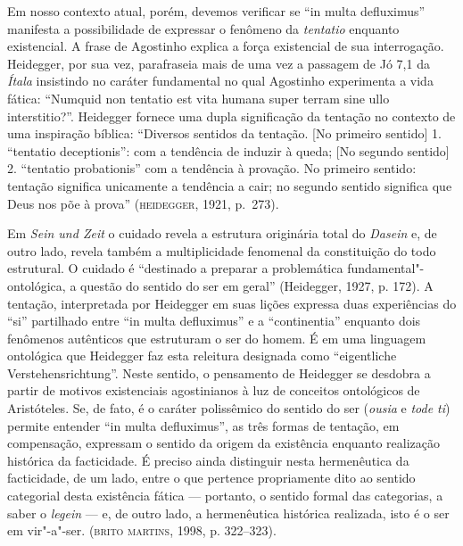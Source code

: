Em nosso contexto atual, porém, devemos verificar se “in multa
defluximus” manifesta a possibilidade de expressar o fenômeno da
\emph{tentatio} enquanto existencial. A frase de Agostinho
explica a força existencial de sua interrogação. Heidegger, por
sua vez, parafraseia mais de uma vez a passagem de Jó 7,1 da
\emph{Ítala} insistindo no caráter fundamental no qual
Agostinho experimenta a vida fática: “Numquid non tentatio est
vita humana super terram sine ullo interstitio?”. Heidegger
fornece uma dupla significação da tentação no contexto de uma
inspiração bíblica: “Diversos sentidos da tentação. [No primeiro
sentido] 1. ``tentatio deceptionis'': com a tendência de induzir à
queda; [No segundo sentido] 2. ``tentatio probationis'' com a
tendência à provação. No primeiro sentido: tentação significa
unicamente a tendência a cair; no segundo sentido significa que
Deus nos põe à prova”  (\textsc{heidegger}, 1921, p.~273).

Em \emph{Sein und Zeit} o cuidado revela a estrutura originária
total do \emph{Dasein} e, de outro lado, revela também a
multiplicidade fenomenal da constituição do todo estrutural. O
cuidado é “destinado a preparar a problemática
fundamental"-ontológica, a questão do sentido do ser em geral”
(Heidegger, 1927, p. 172). A tentação, interpretada por
Heidegger em suas lições expressa duas experiências do “si”
partilhado entre “in multa defluximus” e a “continentia”
enquanto dois fenômenos autênticos que estruturam o ser do
homem. É em uma linguagem ontológica que Heidegger faz esta
releitura designada como “eigentliche Verstehensrichtung”. Neste
sentido, o pensamento de Heidegger se desdobra a partir de
motivos existenciais agostinianos à luz de conceitos ontológicos
de Aristóteles. Se, de fato, é o caráter polissêmico do sentido
do ser (\emph{ousia} e \emph{tode ti}) permite entender “in
multa defluximus”, as três formas de tentação, em compensação,
expressam o sentido da origem da existência enquanto realização
histórica da facticidade. É preciso ainda distinguir nesta
hermenêutica da facticidade, de um lado, entre o que pertence
propriamente dito ao sentido categorial desta existência fática
--- portanto, o sentido formal das categorias, a saber o
\emph{legein} --- e, de outro lado, a hermenêutica histórica
realizada, isto é o ser em vir"-a"-ser. (\textsc{brito martins}, 1998, p.
322--323).

